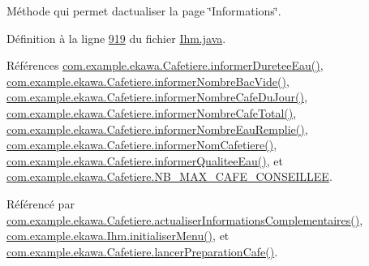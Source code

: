 Méthode qui permet d\textquotesingle{}actualiser la page \char`\"{}\+Informations\char`\"{}. 



Définition à la ligne \hyperlink{_ihm_8java_source_l00919}{919} du fichier \hyperlink{_ihm_8java_source}{Ihm.\+java}.



Références \hyperlink{_cafetiere_8java_source_l00378}{com.\+example.\+ekawa.\+Cafetiere.\+informer\+Duretee\+Eau()}, \hyperlink{_cafetiere_8java_source_l00358}{com.\+example.\+ekawa.\+Cafetiere.\+informer\+Nombre\+Bac\+Vide()}, \hyperlink{_cafetiere_8java_source_l00326}{com.\+example.\+ekawa.\+Cafetiere.\+informer\+Nombre\+Cafe\+Du\+Jour()}, \hyperlink{_cafetiere_8java_source_l00348}{com.\+example.\+ekawa.\+Cafetiere.\+informer\+Nombre\+Cafe\+Total()}, \hyperlink{_cafetiere_8java_source_l00368}{com.\+example.\+ekawa.\+Cafetiere.\+informer\+Nombre\+Eau\+Remplie()}, \hyperlink{_cafetiere_8java_source_l00336}{com.\+example.\+ekawa.\+Cafetiere.\+informer\+Nom\+Cafetiere()}, \hyperlink{_cafetiere_8java_source_l00388}{com.\+example.\+ekawa.\+Cafetiere.\+informer\+Qualitee\+Eau()}, et \hyperlink{_cafetiere_8java_source_l00031}{com.\+example.\+ekawa.\+Cafetiere.\+N\+B\+\_\+\+M\+A\+X\+\_\+\+C\+A\+F\+E\+\_\+\+C\+O\+N\+S\+E\+I\+L\+L\+EE}.



Référencé par \hyperlink{_cafetiere_8java_source_l00574}{com.\+example.\+ekawa.\+Cafetiere.\+actualiser\+Informations\+Complementaires()}, \hyperlink{_ihm_8java_source_l00550}{com.\+example.\+ekawa.\+Ihm.\+initialiser\+Menu()}, et \hyperlink{_cafetiere_8java_source_l00527}{com.\+example.\+ekawa.\+Cafetiere.\+lancer\+Preparation\+Cafe()}.


